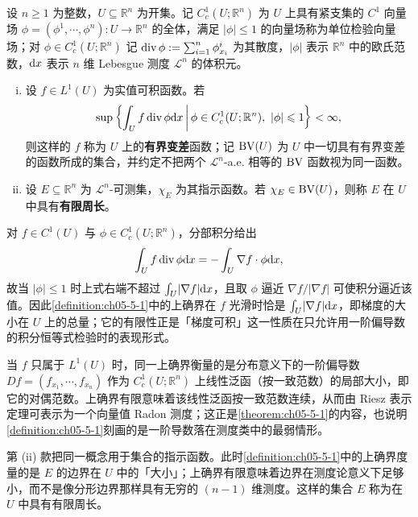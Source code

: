\documentclass[../../main.tex]{subfiles}%
\begin{document}
\begin{definition}[有界变差与有限周长]\label{definition:ch05-5-1}
设 $n\geqslant1$ 为整数，$U\subseteq\mathbb{R}^n$ 为开集。记 $C_c^1(U;\mathbb{R}^n)$ 为 $U$ 上具有紧支集的 $C^1$ 向量场 $\phi=(\phi^1,\cdots,\phi^n):U\to\mathbb{R}^n$ 的全体，满足 $\lvert\phi\rvert\leqslant1$ 的向量场称为单位检验向量场；对 $\phi\in C_c^1(U;\mathbb{R}^n)$ 记 $\operatorname{div}\phi:=\sum_{i=1}^{n}\phi^i_{x_i}$ 为其散度，$\lvert\phi\rvert$ 表示 $\mathbb{R}^n$ 中的欧氏范数，$\mathrm{d} x$ 表示 $n$ 维 Lebesgue 测度 $\mathcal{L}^n$ 的体积元。
\begin{enumerate}[(i)]
\item 设 $f\in L^1(U)$ 为实值可积函数。若
\begin{align*}
\sup\left\{\int_U f\operatorname{div}\phi\mathrm{d} x\,\middle|\,\phi\in C_c^1(U;\mathbb{R}^n),\ \lvert\phi\rvert\leqslant1\right\}<\infty,
\end{align*}
则这样的 $f$ 称为 $U$ 上的\textbf{有界变差}函数；记 $\mathrm{BV}(U)$ 为 $U$ 中一切具有有界变差的函数所成的集合，并约定不把两个 $\mathcal{L}^n$-a.e. 相等的 $\mathrm{BV}$ 函数视为同一函数。
\item 设 $E\subseteq\mathbb{R}^n$ 为 $\mathcal{L}^n$-可测集，$\chi_E$ 为其指示函数。若 $\chi_E\in\mathrm{BV}(U)$，则称 $E$ 在 $U$ 中具有\textbf{有限周长}。
\end{enumerate}
\end{definition}

\begin{remark}\label{remark:ch05-def-5-1-动机}
对 $f\in C^1(U)$ 与 $\phi\in C_c^1(U;\mathbb{R}^n)$，分部积分给出
\begin{align*}
\int_U f\operatorname{div}\phi\mathrm{d} x=-\int_U\nabla f\cdot\phi\mathrm{d} x,
\end{align*}
故当 $\lvert\phi\rvert\leqslant1$ 时上式右端不超过 $\int_U\lvert\nabla f\rvert\mathrm{d} x$，且取 $\phi$ 逼近 $\nabla f/\lvert\nabla f\rvert$ 可使积分逼近该值。因此\cref{definition:ch05-5-1}中的上确界在 $f$ 光滑时恰是 $\int_U\lvert\nabla f\rvert\mathrm{d} x$，即梯度的大小在 $U$ 上的总量；它的有限性正是「梯度可积」这一性质在只允许用一阶偏导数的积分恒等式检验时的表现形式。%

当 $f$ 只属于 $L^1(U)$ 时，同一上确界衡量的是分布意义下的一阶偏导数 $Df=(f_{x_1},\cdots,f_{x_n})$ 作为 $C_c^1(U;\mathbb{R}^n)$ 上线性泛函（按一致范数）的局部大小，即它的对偶范数。上确界有限意味着该线性泛函按一致范数连续，从而由 Riesz 表示定理可表示为一个向量值 Radon 测度；这正是\cref{theorem:ch05-5-1}的内容，也说明\cref{definition:ch05-5-1}刻画的是一阶导数落在测度类中的最弱情形。%

第 (ii) 款把同一概念用于集合的指示函数。此时\cref{definition:ch05-5-1}中的上确界度量的是 $E$ 的边界在 $U$ 中的「大小」；上确界有限意味着边界在测度论意义下足够小，而不是像分形边界那样具有无穷的 $(n-1)$ 维测度。这样的集合 $E$ 称为在 $U$ 中具有有限周长。%
\end{remark}
\end{document}
